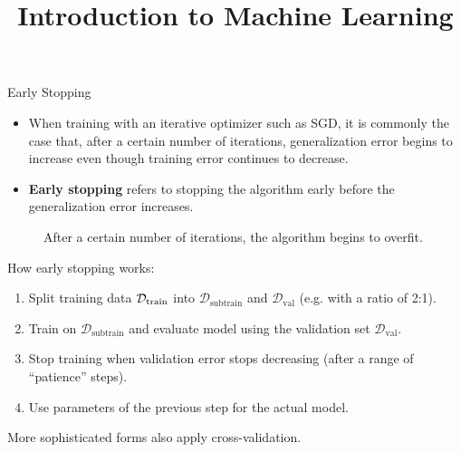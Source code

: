 \documentclass[11pt,compress,t,notes=noshow, xcolor=table]{beamer}
\title{Introduction to Machine Learning}
\date{}
\begin{document}



\begin{vbframe}{Early Stopping}
  
  \begin{itemize}
    \item When training with an iterative optimizer such as SGD, it is commonly the case that, after a certain number of iterations, generalization error begins to increase even though training error continues to decrease.     
    \item \textbf{Early stopping} refers to stopping the algorithm early before the generalization error increases.
  \end{itemize}
  \begin{figure}
    \centering
      \caption{After a certain number of iterations, the algorithm begins to overfit.}
  \end{figure}
\framebreak
  How early stopping works:
  \begin{enumerate}
    \item Split training data $\mathcal{D}_{\text{train}}$ into $\mathcal{D}_{\text{subtrain}}$ and $\mathcal{D}_{\text{val}}$ (e.g. with a ratio of 2:1).
    \item Train on $\mathcal{D}_{\text{subtrain}}$ and evaluate model using the validation set $\mathcal{D}_{\text{val}}$.
    \item Stop training when validation error stops decreasing (after a range of \enquote{patience} steps).
    \item Use parameters of the previous step for the actual model.
  \end{enumerate}
  More sophisticated forms also apply cross-validation.
\end{vbframe}
\end{document}
